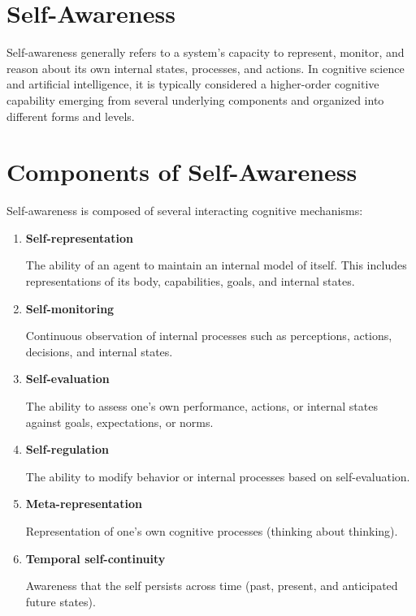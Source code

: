 \documentclass{article}
\begin{document}
    
    \section{Self-Awareness}
        
        Self-awareness generally refers to a system's capacity to represent, monitor, and reason about its own internal states, processes, and actions. In cognitive science and artificial intelligence, it is typically considered a higher-order cognitive capability emerging from several underlying components and organized into different forms and levels.
    
    
    \section{Components of Self-Awareness}
        
        Self-awareness is composed of several interacting cognitive mechanisms:
        
        \begin{enumerate}[label=\arabic*.]
\item \textbf{Self-representation}

The ability of an agent to maintain an internal model of itself. This includes representations of its body, capabilities, goals, and internal states.

\item \textbf{Self-monitoring}

Continuous observation of internal processes such as perceptions, actions, decisions, and internal states.

\item \textbf{Self-evaluation}

The ability to assess one's own performance, actions, or internal states against goals, expectations, or norms.

\item \textbf{Self-regulation}

The ability to modify behavior or internal processes based on self-evaluation.

\item \textbf{Meta-representation}

Representation of one's own cognitive processes (thinking about thinking).

\item \textbf{Temporal self-continuity}

Awareness that the self persists across time (past, present, and anticipated future states).
        \end{enumerate}
        
\end{document}
